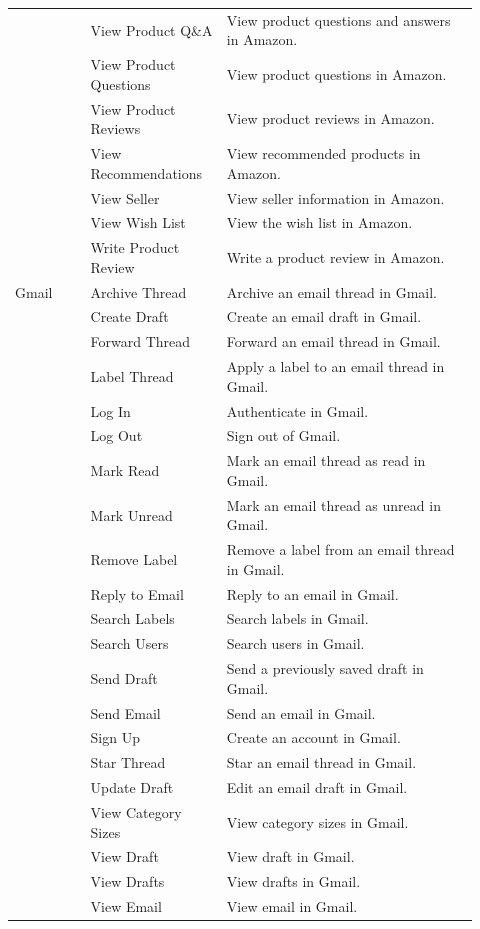 \documentclass{llmxive}
\begin{document}
\begin{longtable}{@{}p{0.15\linewidth}p{0.27\linewidth}p{0.50\linewidth}@{}}
 & View Product Q\&A & View product questions and answers in Amazon. \\
 & View Product Questions & View product questions in Amazon. \\
 & View Product Reviews & View product reviews in Amazon. \\
 & View Recommendations & View recommended products in Amazon. \\
 & View Seller & View seller information in Amazon. \\
 & View Wish List & View the wish list in Amazon. \\
 & Write Product Review & Write a product review in Amazon. \\
\midrule
Gmail & Archive Thread & Archive an email thread in Gmail. \\
 & Create Draft & Create an email draft in Gmail. \\
 & Forward Thread & Forward an email thread in Gmail. \\
 & Label Thread & Apply a label to an email thread in Gmail. \\
 & Log In & Authenticate in Gmail. \\
 & Log Out & Sign out of Gmail. \\
 & Mark Read & Mark an email thread as read in Gmail. \\
 & Mark Unread & Mark an email thread as unread in Gmail. \\
 & Remove Label & Remove a label from an email thread in Gmail. \\
 & Reply to Email & Reply to an email in Gmail. \\
 & Search Labels & Search labels in Gmail. \\
 & Search Users & Search users in Gmail. \\
 & Send Draft & Send a previously saved draft in Gmail. \\
 & Send Email & Send an email in Gmail. \\
 & Sign Up & Create an account in Gmail. \\
 & Star Thread & Star an email thread in Gmail. \\
 & Update Draft & Edit an email draft in Gmail. \\
 & View Category Sizes & View category sizes in Gmail. \\
 & View Draft & View draft in Gmail. \\
 & View Drafts & View drafts in Gmail. \\
 & View Email & View email in Gmail. \\

\end{longtable}
\end{document}
